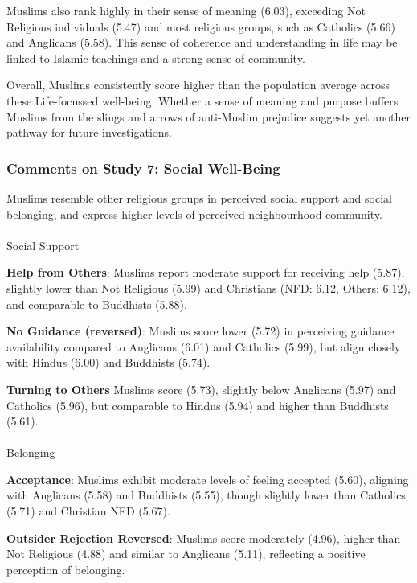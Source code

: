 \documentclass[
  single column]{article}
\makeatletter
\let\oldparagraph\paragraph
\renewcommand{\paragraph}{
    \@ifstar
      \xxxParagraphStar
      \xxxParagraphNoStar
  }
\newcommand{\xxxParagraphStar}[1]{\oldparagraph*{#1}\mbox{}}
\newcommand{\xxxParagraphNoStar}[1]{\oldparagraph{#1}\mbox{}}
\makeatother
\begin{document}
Muslims also rank highly in their sense of meaning (6.03), exceeding Not
Religious individuals (5.47) and most religious groups, such as
Catholics (5.66) and Anglicans (5.58). This sense of coherence and
understanding in life may be linked to Islamic teachings and a strong
sense of community.

Overall, Muslims consistently score higher than the population average
across these Life-focussed well-being. Whether a sense of meaning and
purpose buffers Muslims from the slings and arrows of anti-Muslim
prejudice suggests yet another pathway for future investigations.

\subsubsection{Comments on Study 7: Social
Well-Being}\label{comments-on-study-7-social-well-being}

Muslims resemble other religious groups in perceived social support and
social belonging, and express higher levels of perceived neighbourhood
community.

\paragraph{Social Support}\label{social-support}

\textbf{Help from Others}: Muslims report moderate support for receiving
help (5.87), slightly lower than Not Religious (5.99) and Christians
(NFD: 6.12, Others: 6.12), and comparable to Buddhists (5.88).

\textbf{No Guidance (reversed)}: Muslims score lower (5.72) in
perceiving guidance availability compared to Anglicans (6.01) and
Catholics (5.99), but align closely with Hindus (6.00) and Buddhists
(5.74).

\textbf{Turning to Others} Muslims score (5.73), slightly below
Anglicans (5.97) and Catholics (5.96), but comparable to Hindus (5.94)
and higher than Buddhists (5.61).

\paragraph{Belonging}\label{belonging}

\textbf{Acceptance}: Muslims exhibit moderate levels of feeling accepted
(5.60), aligning with Anglicans (5.58) and Buddhists (5.55), though
slightly lower than Catholics (5.71) and Christian NFD (5.67).

\textbf{Outsider Rejection Reversed}: Muslims score moderately (4.96),
higher than Not Religious (4.88) and similar to Anglicans (5.11),
reflecting a positive perception of belonging.
\end{document}
